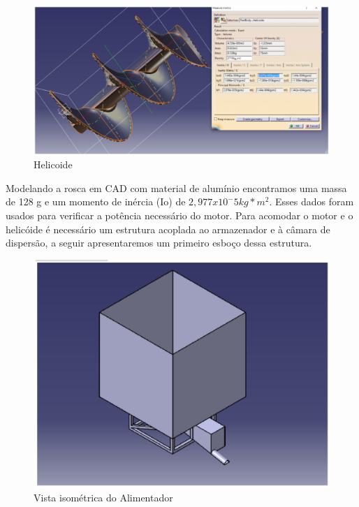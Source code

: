 \begin{figure}[H]
 \centering
   \includegraphics[keepaspectratio=true,scale=0.8]{figuras/rosca_cad.eps}
 \caption{Helicoide}
 \label{rosca_cad}
\end{figure}

Modelando a rosca em CAD com material de alumínio encontramos uma massa de 128 g e um momento de inércia  (Io) de $2,977x10^-5 kg*m^2$. Esses dados foram usados para verificar a potência necessário do motor. Para acomodar o motor e o helicóide é necessário um estrutura acoplada ao armazenador e à câmara de dispersão, a seguir apresentaremos um primeiro esboço dessa estrutura.

\begin{figure}[H]
 \centering
   \includegraphics[keepaspectratio=true,scale=0.8]{figuras/vista_iso_alimentador.eps}
 \caption{Vista isométrica do Alimentador}
 \label{vista_iso_alimentador}
\end{figure}

